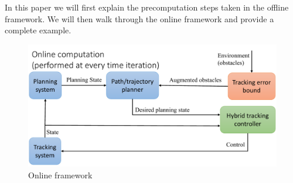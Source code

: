 In this paper we will first explain the precomputation steps taken in the offline framework. We will then walk through the online framework and provide a complete example.
%
%
%
%
%

\begin{figure}[h!]
\includegraphics[width=\columnwidth]{fig/framework_online}
\caption{Online framework}
\label{fig:fw_online}
\vspace{-.2in}
\end{figure}

